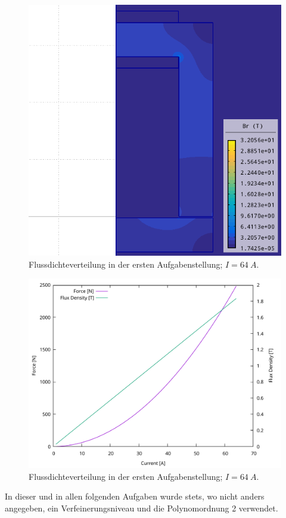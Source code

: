\documentclass[conference,a4paper,twoside]{IEEEtran}
\begin{document}
\begin{figure}
\centerline{\includegraphics[width=0.7\columnwidth]{../assets/assignment_1_simulation.png}}
\caption{Flussdichteverteilung in der ersten Aufgabenstellung; $I = 64\ A$.}
\label{assignment_1_simulation}
\end{figure}

\begin{figure}
\centerline{\includegraphics[width=\columnwidth]{../assets/assignment_1_plot.pdf}}
\caption{Flussdichteverteilung in der ersten Aufgabenstellung; $I = 64\ A$.}
\label{assignment_1_plot}
\end{figure}

In dieser und in allen folgenden Aufgaben wurde stets, wo nicht anders angegeben, ein Verfeinerungsniveau und die Polynomordnung 2 verwendet.
\end{document}
